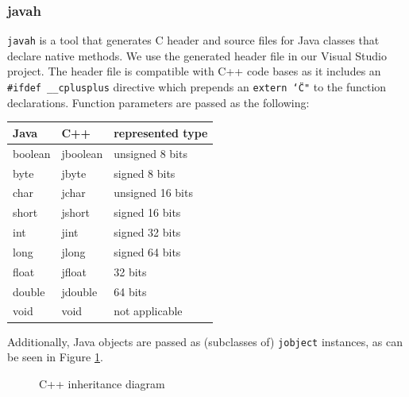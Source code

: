 \documentclass[]{article}
\begin{document}
\subsubsection{javah}
\texttt{javah} is a tool that generates C header and source files for Java classes that declare native methods.
We use the generated header file in our Visual Studio project.
The header file is compatible with C++ code bases as it includes an \texttt{\#ifdef \_\_cplusplus} directive which prepends an \texttt{extern \char`\"C"} to the function declarations.
\cite{noauthor_jni_nodate} Function parameters are passed as the following:

\begin{center}
\begin{tabular}{|l|l|l|} \hline
  Java & C++ & represented type \\ \hline
  boolean & jboolean & unsigned 8 bits \\ 
  byte & jbyte & signed 8 bits \\ 
  char & jchar & unsigned 16 bits \\ 
  short & jshort & signed 16 bits \\ 
  int & jint & signed 32 bits \\ 
  long & jlong & signed 64 bits \\ 
  float & jfloat & 32 bits \\ 
  double & jdouble & 64 bits \\ 
  void & void & not applicable \\ \hline
\end{tabular}
\end{center}

Additionally, Java objects are passed as (subclasses of) \texttt{jobject} instances, as can be seen in Figure \ref{fig:jobject}.

\begin{figure}
  \begin{center}
  \end{center}
\caption{C++ inheritance diagram}
\label{fig:jobject}
\end{figure}
\end{document}
